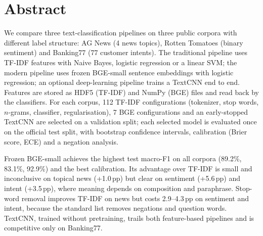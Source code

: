 \section*{Abstract}

We compare three text-classification pipelines on three public corpora with different label structure: AG News (4 news topics), Rotten Tomatoes (binary sentiment) and Banking77 (77 customer intents). The traditional pipeline uses TF-IDF features with Naive Bayes, logistic regression or a linear SVM; the modern pipeline uses frozen BGE-small sentence embeddings with logistic regression; an optional deep-learning pipeline trains a TextCNN end to end. Features are stored as HDF5 (TF-IDF) and NumPy (BGE) files and read back by the classifiers. For each corpus, 112 TF-IDF configurations (tokenizer, stop words, $n$-grams, classifier, regularisation), 7 BGE configurations and an early-stopped TextCNN are selected on a validation split; each selected model is evaluated once on the official test split, with bootstrap confidence intervals, calibration (Brier score, ECE) and a negation analysis.

Frozen BGE-small achieves the highest test macro-F1 on all corpora (89.2\%, 83.1\%, 92.9\%) and the best calibration. Its advantage over TF-IDF is small and inconclusive on topical news (+1.0\,pp) but clear on sentiment (+5.6\,pp) and intent (+3.5\,pp), where meaning depends on composition and paraphrase. Stop-word removal improves TF-IDF on news but costs 2.9--4.3\,pp on sentiment and intent, because the standard list removes negations and question words. TextCNN, trained without pretraining, trails both feature-based pipelines and is competitive only on Banking77.
